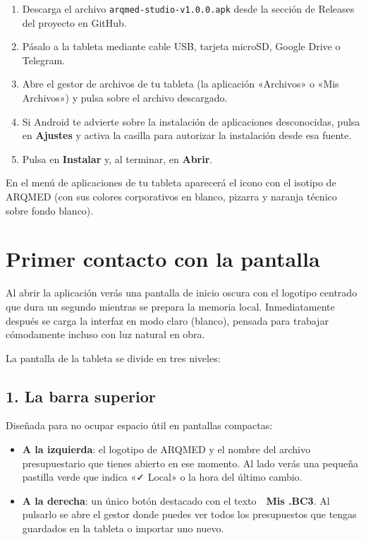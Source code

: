 \documentclass[11pt,a4paper]{article}
\begin{document}
\begin{pasobox}
\begin{enumerate}[leftmargin=*]
    \item Descarga el archivo \texttt{arqmed-studio-v1.0.0.apk} desde la sección de Releases del proyecto en GitHub.
    \item Pásalo a la tableta mediante cable USB, tarjeta microSD, Google Drive o Telegram.
    \item Abre el gestor de archivos de tu tableta (la aplicación «Archivos» o «Mis Archivos») y pulsa sobre el archivo descargado.
    \item Si Android te advierte sobre la instalación de aplicaciones desconocidas, pulsa en \textbf{Ajustes} y activa la casilla para autorizar la instalación desde esa fuente.
    \item Pulsa en \textbf{Instalar} y, al terminar, en \textbf{Abrir}.
\end{enumerate}
\end{pasobox}

En el menú de aplicaciones de tu tableta aparecerá el icono con el isotipo de ARQMED (con sus colores corporativos en blanco, pizarra y naranja técnico sobre fondo blanco).

\section{Primer contacto con la pantalla}

Al abrir la aplicación verás una pantalla de inicio oscura con el logotipo centrado que dura un segundo mientras se prepara la memoria local. Inmediatamente después se carga la interfaz en modo claro (blanco), pensada para trabajar cómodamente incluso con luz natural en obra.

La pantalla de la tableta se divide en tres niveles:

\subsection{1. La barra superior}
Diseñada para no ocupar espacio útil en pantallas compactas:
\begin{itemize}[leftmargin=*]
    \item \textbf{A la izquierda}: el logotipo de ARQMED y el nombre del archivo presupuestario que tienes abierto en ese momento. Al lado verás una pequeña pastilla verde que indica «✓ Local» o la hora del último cambio.
    \item \textbf{A la derecha}: un único botón destacado con el texto \textbf{📁 Mis .BC3}. Al pulsarlo se abre el gestor donde puedes ver todos los presupuestos que tengas guardados en la tableta o importar uno nuevo.
\end{itemize}
\end{document}
